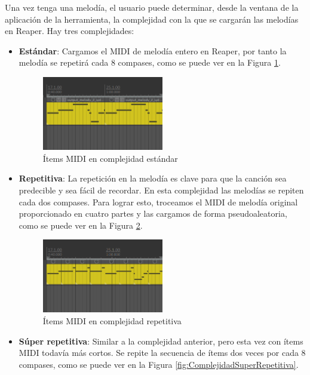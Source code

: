 Una vez tenga una melodía, el usuario puede determinar, desde la ventana de la aplicación de la herramienta, la complejidad con la que se cargarán las melodías en Reaper. Hay tres complejidades:
\begin{itemize}
    \item \textbf{Estándar}: Cargamos el MIDI de melodía entero en Reaper, por tanto la melodía se repetirá cada 8 compases, como se puede ver en la Figura \ref{fig:ComplejidadEstandar}. 

\begin{figure}[h]
    \centering
    \includegraphics[width = 0.5\textwidth]{Imagenes/Bitmap/ComplejidadEstandar.png}
    \caption{Ítems MIDI en complejidad estándar}
    \label{fig:ComplejidadEstandar}
\end{figure}
    \item \textbf{Repetitiva}: 
La repetición en la melodía es clave para que la canción sea predecible y sea fácil de recordar. En esta complejidad las melodías se repiten cada dos compases. Para lograr esto, troceamos el MIDI de melodía original proporcionado en cuatro partes y las cargamos de forma pseudoaleatoria, como se puede ver en la Figura \ref{fig:ComplejidadRepetitiva}.

\begin{figure}[h]
    \centering
    \includegraphics[width = 0.5\textwidth]{Imagenes/Bitmap/ComplejidadRepetitiva.png}
    \caption{Ítems MIDI en complejidad repetitiva}
    \label{fig:ComplejidadRepetitiva}
\end{figure}

    \item \textbf{Súper repetitiva}: Similar a la complejidad anterior, pero esta vez con ítems MIDI todavía más cortos. Se repite la secuencia de ítems dos veces por cada 8 compases, como se puede ver en la Figura \ref{fig:ComplejidadSuperRepetitiva}.


\end{itemize}
